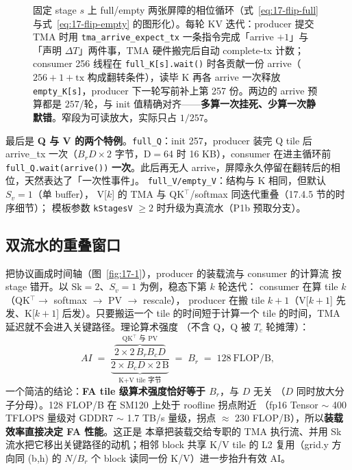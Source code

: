 \begin{figure}[H]
\caption{固定 stage $s$ 上 full/empty 两张屏障的相位循环（式~\ref{eq:17-flip-full} 与式~\ref{eq:17-flip-empty} 的图形化）。每轮 KV 迭代：producer 提交 TMA 时用 \texttt{tma\_arrive\_expect\_tx} 一条指令完成「arrive $+1$」与「声明 $\Delta T$」两件事，TMA 硬件搬完后自动 complete-tx 计数；consumer 256 线程在 \texttt{full\_K[s].wait()} 时各贡献一份 arrive（$256+1+\text{tx}$ 构成翻转条件），读毕 K 再各 arrive 一次释放 \texttt{empty\_K[s]}，producer 下一轮写前补上第 257 份。两边的 arrive 预算都是 $257$/轮，与 init 值精确对齐——\textbf{多算一次挂死、少算一次静默错}。窄段为可读放大，实际只占 $1/257$。}
\label{fig:17-arrive-cycle}
\end{figure}

最后是 \textbf{Q 与 V 的两个特例}。\texttt{full\_Q}：init 257，producer 装完
Q tile 后 arrive\_tx 一次（$B_r D \times 2$ 字节，D$=$64 时 16 KB），consumer
在进主循环前 \texttt{full\_\allowbreak{}Q.\allowbreak{}wait\allowbreak{}(arrive\allowbreak{}())} \textbf{一次}。此后再无人
arrive，屏障永久停留在翻转后的相位，天然表达了「一次性事件」。
\texttt{full\_\allowbreak{}V/\allowbreak{}empty\_\allowbreak{}V}：结构与 K 相同，但默认 $S_v = 1$（单 buffer），
V[$k$] 的 TMA 与 QK$^\top$/softmax 同迭代重叠（17.4.5 节的时序细节）；
模板参数 \texttt{kStagesV} $\ge 2$ 时升级为真流水（P1b 预取分支）。

\subsection{双流水的重叠窗口}

把协议画成时间轴（图~\ref{fig:17-1}），producer 的装载流与 consumer 的计算流
按 stage 错开。以 $\mathrm{Sk} = 2$、$S_v = 1$ 为例，稳态下第 $k$ 轮迭代：
consumer 在算 tile $k$（QK$^\top \to$ softmax $\to$ PV $\to$ rescale），
producer 在搬 tile $k{+}1$（V[$k{+}1$] 先发、K[$k{+}1$] 后发）。只要搬运一个
tile 的时间短于计算一个 tile 的时间，TMA 延迟就不会进入关键路径。理论算术强度
（不含 Q，Q 被 $T_c$ 轮摊薄）：
\begin{equation}
  AI \;=\; \frac{\overbrace{2 \times 2\, B_r B_c D}^{\text{QK}^\top\text{ 与 PV}}}
  {\underbrace{2 \times B_c D \times 2\,\mathrm{B}}_{\text{K+V tile 字节}}}
  \;=\; B_r \;=\; 128 \ \mathrm{FLOP/B} ,
  \label{eq:17-ai}
\end{equation}
一个简洁的结论：\textbf{FA tile 级算术强度恰好等于 $B_r$}，与 $D$ 无关
（$D$ 同时放大分子分母）。128 FLOP/B 在 SM120 上处于 roofline 拐点附近
（fp16 Tensor $\sim$ 400 TFLOPS 量级对 GDDR7 $\sim$ 1.7 TB/s 量级，拐点
$\approx$ 230 FLOP/B），所以\textbf{装载效率直接决定 FA 性能}。这正是
本章把装载交给专职的 TMA 执行流、并用 Sk 流水把它移出关键路径的动机；相邻 block
共享 K/V tile 的 L2 复用（grid.y 方向同 (b,h) 的 $N/B_r$ 个 block 读同一份
K/V）进一步抬升有效 AI。

